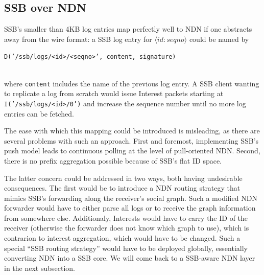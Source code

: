\documentclass[9pt,sigconf,rewiew]{acmart}
\begin{document}
\subsection{SSB over NDN}
\label{ssect:ssb-over-ndn}

SSB's smaller than 4KB log entries map perfectly well to NDN if one
abstracts away from the wire format: a SSB
log entry for \mbox{$\langle id:seqno\rangle$} could be named by\\
  \centerline{\tt D('/ssb/logs/<id>/<seqno>', content, signature)} \\
where {\tt content} includes the name of the previous log entry.
%
%
A SSB client wanting to replicate a log from scratch would issue
Interest packets starting at {\tt I('/ssb/logs/<id>/0')} and increase the
sequence number until no more log entries can be fetched.

The ease with which this mapping could be introduced is misleading, as
there are several problems with such an approach. First and foremost,
implementing SSB's push model leads to continuous polling at the level
of pull-oriented NDN. Second, there is no prefix aggregation possible
because of SSB's flat ID space.

The latter concern could be addressed in two ways, both having
undesirable consequences. The first would be to introduce a NDN
routing strategy that mimics SSB's forwarding along the receiver's
social graph. Such a modified NDN forwarder would have to either parse
all logs or to receive the graph information from somewhere
else. Additionaly, Interests would have to carry the ID of the
receiver (otherwise the forwarder does not know which graph to use),
which is contrarion to interest aggregation, which would have to be
changed.  Such a special ``SSB routing strategy'' would have to be
deployed globally, essentially converting NDN into a SSB core. We will
come back to a SSB-aware NDN layer in the next subsection.
\end{document}

